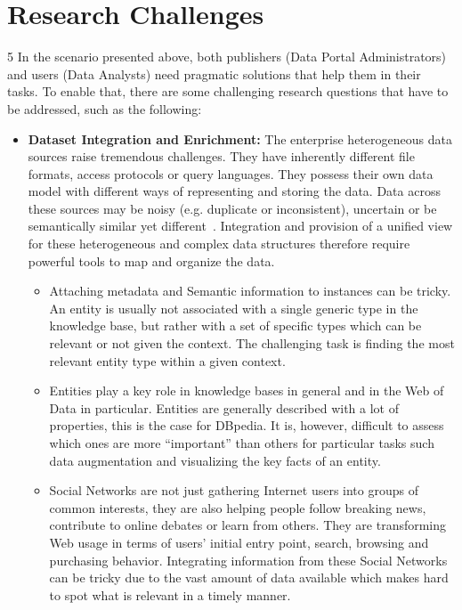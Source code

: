\section{Research Challenges} \label{sec:challenges}
5
In the scenario presented above, both publishers (Data Portal Administrators) and users (Data Analysts) need pragmatic solutions that help them in their tasks. To enable that, there are some challenging research questions that have to be addressed, such as the following:

\begin{itemize}
\item \textbf{Dataset Integration and Enrichment:} The enterprise heterogeneous data sources raise tremendous challenges. They have inherently different file formats, access protocols or query languages. They possess their own data model with different ways of representing and storing the data. Data across these sources may be noisy (e.g. duplicate or inconsistent), uncertain or be semantically similar yet different~\cite{Avitha:EuroJorunal:11}. Integration and provision of a unified view for these heterogeneous and complex data structures therefore require powerful tools to map and organize the data.
\begin{itemize}
	\item Attaching metadata and Semantic information to instances can be tricky. An entity is usually not associated with a single generic type in the knowledge base, but rather with a set of specific types which can be relevant or not given the context. The challenging task is finding the most relevant entity type within a given context.
	\item Entities play a key role in knowledge bases in general and in the Web of Data in particular. Entities are generally described with a lot of properties, this is the case for DBpedia. It is, however, difficult to assess which ones are more ``important'' than others for particular tasks such data augmentation and visualizing the key facts of an entity.
	\item Social Networks are not just gathering Internet users into groups of common interests, they are also helping people follow breaking news, contribute to online debates or learn from others. They are transforming Web usage in terms of users' initial entry point, search, browsing and purchasing behavior. Integrating information from these Social Networks can be tricky due to the vast amount of data available which makes hard to spot what is relevant in a timely manner.
\end{itemize}

\end{itemize}
